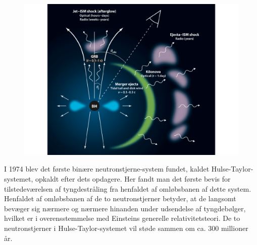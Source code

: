 \documentclass[twocolumn]{article}
\begin{document}
\begin{figure}
\includegraphics[width=\columnwidth]{KN_scematic_berger.pdf}
\end{figure}

I 1974 blev det første binære neutronstjerne-system fundet, kaldet Hulse-Taylor-systemet, opkaldt efter dets opdagere. Her fandt man det første bevis for tilstedeværelsen af tyngdestråling fra henfaldet af omløbsbanen af dette system. %
Henfaldet af omløbsbanen af de to neutronstjerner betyder, at de langsomt bevæger sig nærmere og nærmere hinanden under udsendelse af tyngdebølger, hvilket er i overensstemmelse med Einsteins generelle relativitetsteori. De to neutronstjerner i Hulse-Taylor-systemet vil støde sammen om ca. 300 millioner år.  
\end{document}

